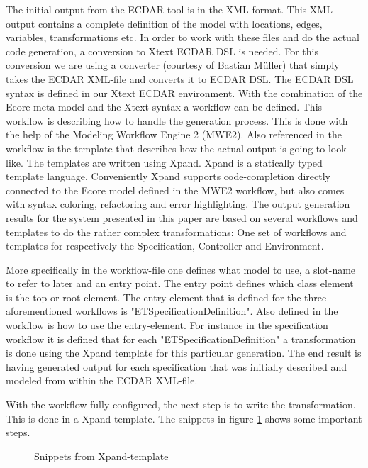 The initial output from the ECDAR tool is in the XML-format. This XML-output
contains a complete definition of the model with locations, edges, variables,
transformations etc. In order to work with these files and do the actual code
generation, a conversion to Xtext ECDAR DSL is needed. For this conversion we
are using a converter (courtesy of Bastian M\"uller) that simply takes the ECDAR XML-file
and converts it to ECDAR DSL. The ECDAR DSL syntax is defined in our Xtext ECDAR
environment. With the combination of the Ecore meta model and the Xtext syntax a
workflow can be defined. This workflow is describing how to handle the
generation process. This is done with the help of the Modeling Workflow Engine 2
(MWE2). Also referenced in the workflow is the template that describes how the
actual output is going to look like. The templates are written using
Xpand. Xpand is a statically typed template language. Conveniently Xpand
supports code-completion directly connected to the Ecore model defined in the
MWE2 workflow, but also comes with syntax coloring, refactoring and error
highlighting. The output generation results for the system presented in this
paper are based on several workflows and templates to do the rather complex
transformations: One set of workflows and templates for respectively the
Specification, Controller and Environment.

More specifically in the workflow-file one defines what model to use, a
slot-name to refer to later and an entry point. The entry point defines which
class element is the top or root element. The entry-element that is defined for
the three aforementioned workflows is "ETSpecificationDefinition". Also defined
in the workflow is how to use the entry-element. For instance in the
specification workflow it is defined that for each "ETSpecificationDefinition" a
transformation is done using the Xpand template for this particular
generation. The end result is having generated output for each specification that
was initially described and modeled from within the ECDAR XML-file.

With the workflow fully configured, the next step is to write the
transformation. This is done in a Xpand template. The snippets in figure
\ref{xpand-example} shows some important steps.

\begin{figure}[t]



\caption{Snippets from Xpand-template \label{xpand-example}}
\end{figure}

